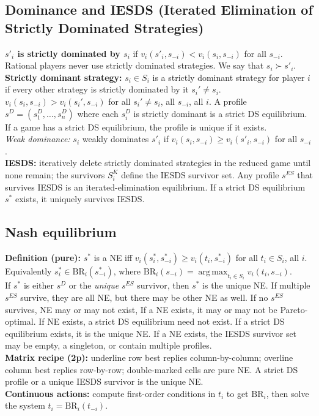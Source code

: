 \documentclass[9pt]{article}
\newcommand{\vi}{v_i}
\newcommand{\BR}{\mathrm{BR}}
\newcommand{\argmax}{\mathop{\mathrm{arg\,max}}}
\begin{document}
\subsection*{Dominance and IESDS (Iterated Elimination of Strictly Dominated Strategies)}
\textbf{$s'_i$ is strictly dominated by $s_i$} if $\vi(s'_i,s_{-i})<\vi(s_i,s_{-i})$ for all $s_{-i}$. Rational players never use strictly dominated strategies. We say that $s_i \succ s'_i$.\\
\textbf{Strictly dominant strategy:} $s_i \in S_i$ is a strictly dominant strategy for player $i$ if every other strategy is strictly dominated by it $s_i'\neq s_i$.
$v_i(s_i,s_{-i})>v_i(s_i',s_{-i})$ for all $s_i'\neq s_i$, all $s_{-i}$, all $i$. A profile $s^D=(s_1^D,\dots,s_n^D)$ where each $s_i^D$ is strictly dominant is a strict DS equilibrium. If a game has a strict DS equilibrium, the profile is unique if it exists.\\
\textit{Weak dominance:} $s_i$ weakly dominates $s'_i$ if $\vi(s_i,s_{-i})\geq \vi(s'_i,s_{-i})$ for all $s_{-i}$.\\
\textbf{IESDS:} iteratively delete strictly dominated strategies in the reduced game until none remain; the survivors $S_i^K$ define the IESDS survivor set. Any profile $s^{ES}$ that survives IESDS is an iterated-elimination equilibrium. If a strict DS equilibrium $s^*$ exists, it uniquely survives IESDS.

\subsection*{Nash equilibrium}
\textbf{Definition (pure):} $s^*$ is a NE iff $\vi(s_i^*,s_{-i}^*)\ge \vi(t_i,s_{-i}^*)$ for all $t_i\in S_i$, all $i$. Equivalently $s_i^*\in \BR_i(s_{-i}^*)$, where $\BR_i(s_{-i})=\argmax_{t_i\in S_i}\vi(t_i,s_{-i})$.\\
If $s^*$ is either $s^D$ or the \textit{unique} $s^{ES}$ survivor, then $s^*$ is the unique NE. If multiple $s^{ES}$ survive, they are all NE, but there may be other NE as well. If no $s^{ES}$ survives, NE may or may not exist, If a NE exists, it may or may not be Pareto-optimal. If NE exists, a strict DS equilibrium need not exist. If a strict DS equilibrium exists, it is the unique NE. If a NE exists, the IESDS survivor set may be empty, a singleton, or contain multiple profiles.\\
\textbf{Matrix recipe (2p):} underline row best replies column-by-column; overline column best replies row-by-row; double-marked cells are pure NE. A strict DS profile or a unique IESDS survivor is the unique NE.\\
\textbf{Continuous actions:} compute first-order conditions in $t_i$ to get $\BR_i$, then solve the system $t_i=\BR_i(t_{-i})$.
\end{document}
